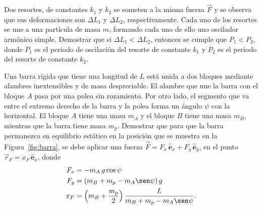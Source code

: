 \documentclass[addpoints]{exam}
\newcommand{\ver}[1]{\hat{\mathbf{#1}}}
\begin{document}
\begin{questions}
    \question Dos resortes, de constantes $k_1$ y $k_2$ se someten a la misma fuerza $\vec{F}$ y se observa que sus deformaciones son $\Delta L_1$ y $\Delta L_2$, respectivamente. Cada uno de los resortes se une a una partícula de masa $m$, formando cada uno de ello uno oscilador armónico simple. Demostrar que si $\Delta L_1 < \Delta L_2$, entonces se cumple que $P_1 < P_2$, donde $P_1$ es el periodo de oscilación del resorte de constante $k_1$ y $P_2$ es el periodo del resorte de constante $k_2$.

    \question \label{ej:equilbrio_CR} Una barra rígida que tiene una longitud de $L$ está unida a dos bloques mediante alambres inextensibles y de masa despreciable. El alambre que une la barra con el bloque $A$ pasa por una polea sin rozamiento. Por otro lado, el segmento que va entre el extremo derecho de la barra y la polea forma un ángulo $\psi$ con la horizontal. El bloque $A$ tiene una masa $m_A$ y el bloque $B$ tiene una masa $m_B$, mientras que la barra tiene masa $m_p$. Demostrar que para que la barra permanezca en equilibrio estático en la posición que se muestra en la Figura~\ref{fig:barra}, se debe aplicar una fuerza $\vec{F} = F_x \, \ver{e}_x + F_y \, \ver{e}_y$, en el punto $\vec{r}_F = x_F \, \ver{e}_x$, donde
    \begin{align}
        F_x &= - m_A \, g \cos \psi \\
        F_y &= \left(m_B + m_p - m_A \sen \psi\right) g \\
        x_F &= \left(m_B + \frac{m_p}{2}\right) \frac{L}{m_B + m_p - m_A \sen \psi}.
    \end{align}


\end{questions}
\end{document}

